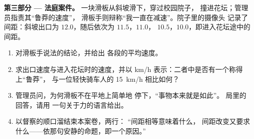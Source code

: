 \begin{problem}
\medskip\noindent\textbf{第三部分 --- 法庭案件。}
一块滑板从斜坡滑下，穿过校园院子，
撞进花坛；管理员指责其“鲁莽的速度”，
滑板手则辩称“我一直在减速”。院子里的摄像头
记录了间距：斜坡出口为 $12.0$，随后依次为 $11.5$，$11.0$，
$10.5$，$10.0$，即进入花坛途中的间距。
\begin{enumerate}[resume]
  \item 对滑板手说法的结论，并给出
        各段的平均速度。
  \item 求出口速度与进入花坛时的速度，并以
        \unit{km/h} 表示：二者中是否有一个称得上“鲁莽”，
        与一位轻快骑车人的 \qty{15}{km/h} 相比如何？
  \item 管理员问，为何滑板不在平地上简单地
        停下，“事物本来就是如此”。
        局里的回答，请用
        一句关于力的语言给出。
  \item 以督察的顺口溜结束本案卷，两行：
        “间距相等意味着什么，
        间距改变又要求什么——依那句安静的命题，即一个原因。”
\end{enumerate}
\end{problem}
